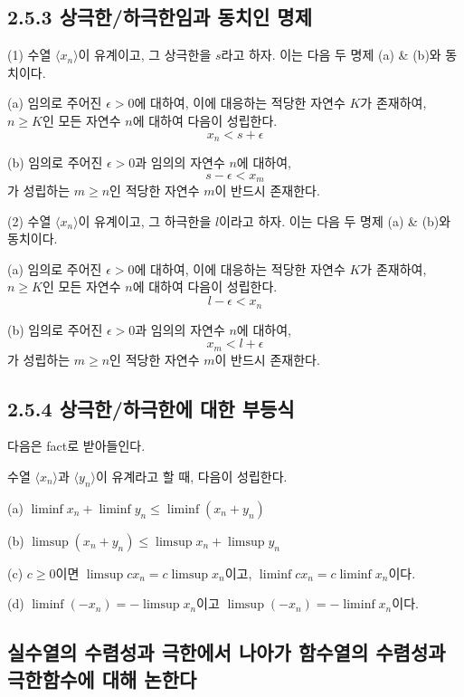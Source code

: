 \documentclass{article}
\begin{document}
\subsection*{\textmd{2.5.3 상극한/하극한임과 동치인 명제}}
(1) 수열 \( \langle x_n \rangle \)이 유계이고, 그 상극한을 \( s \)라고 하자. 이는 다음 두 명제 (a) \& (b)와 동치이다.

(a) 임의로 주어진 \( \epsilon > 0 \)에 대하여, 이에 대응하는 적당한 자연수 \( K \)가 존재하여, \( n \geq K \)인 모든 자연수 \( n \)에 대하여 다음이 성립한다.
\[
x_n < s + \epsilon
\]

(b) 임의로 주어진 \( \epsilon > 0 \)과 임의의 자연수 \( n \)에 대하여, 
\[
s - \epsilon < x_m
\]
가 성립하는
\( m \geq n \)인 적당한 자연수 \( m \)이 반드시 존재한다.

(2) 수열 \( \langle x_n \rangle \)이 유계이고, 그 하극한을 \( l \)이라고 하자. 이는 다음 두 명제 (a) \& (b)와 동치이다.

(a) 임의로 주어진 \( \epsilon > 0 \)에 대하여, 이에 대응하는 적당한 자연수 \( K \)가 존재하여, \( n \geq K \)인 모든 자연수 \( n \)에 대하여 다음이 성립한다.
\[
l - \epsilon < x_n
\]

(b) 임의로 주어진 \( \epsilon > 0 \)과 임의의 자연수 \( n \)에 대하여, 
\[
x_m < l + \epsilon
\]
가 성립하는
\( m \geq n \)인 적당한 자연수 \( m \)이 반드시 존재한다.

\subsection*{\textmd{2.5.4 상극한/하극한에 대한 부등식}}
다음은 fact로 받아들인다.

수열 \( \langle x_n \rangle \)과 \( \langle y_n \rangle \)이 유계라고 할 때, 다음이 성립한다.

(a) \( \liminf x_n + \liminf y_n \leq \liminf (x_n + y_n) \)

(b) \( \limsup (x_n + y_n) \leq \limsup x_n + \limsup y_n \)

(c) \( c \geq 0 \)이면 \( \limsup c x_n = c \limsup x_n \)이고, \( \liminf c x_n = c \liminf x_n \)이다.

(d) \( \liminf (-x_n) = -\limsup x_n \)이고 \( \limsup (-x_n) = -\liminf x_n \)이다.



\subsection{\fontsize{11.5}{13}\selectfont 
실수열의 수렴성과 극한에서 나아가 함수열의 수렴성과 극한함수에 대해 논한다}
\end{document}
